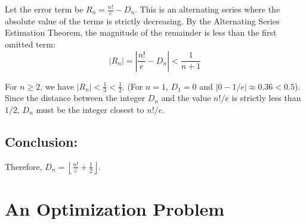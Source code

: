 \documentclass[answers]{exam}
\begin{document}
\begin{questions}
\begin{parts}
\begin{solution}
            Let the error term be $R_n = \frac{n!}{e} - D_n$. This is an alternating series where the absolute value of the terms is strictly decreasing. By the Alternating Series Estimation Theorem, the magnitude of the remainder is less than the first omitted term:
            \[ |R_n| = \left| \frac{n!}{e} - D_n \right| < \frac{1}{n+1} \]
            
            For $n \geq 2$, we have $|R_n| < \frac{1}{3} < \frac{1}{2}$. (For $n=1$, $D_1=0$ and $|0 - 1/e| \approx 0.36 < 0.5$). Since the distance between the integer $D_n$ and the value $n!/e$ is strictly less than $1/2$, $D_n$ must be the integer closest to $n!/e$.

            \subsection*{Conclusion:}
            Therefore, $D_n = \left\lfloor \frac{n!}{e} + \frac{1}{2} \right\rfloor$.	


			
			
		\end{solution}
			
		\end{parts}
	\end{questions}
	
	\section{An Optimization Problem}
	
	
	
\end{document}

